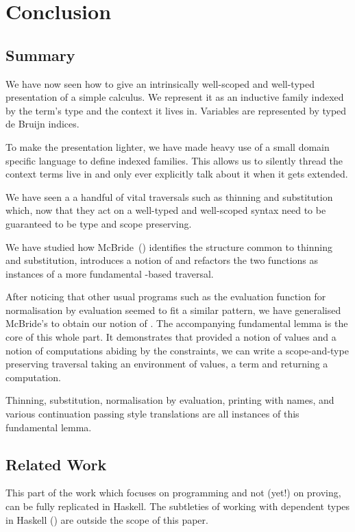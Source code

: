 \chapter{Conclusion}
\label{chapter:program-conclusion}

\section{Summary}

We have now seen how to give an intrinsically well-scoped and well-typed
presentation of a simple calculus. We represent it as an inductive family
indexed by the term's type and the context it lives in. Variables are
represented by typed de Bruijn indices.

To make the presentation lighter, we have made heavy use of a small domain
specific language to define indexed families. This allows us to silently
thread the context terms live in and only ever explicitly talk about it
when it gets extended.

We have seen a a handful of vital traversals such as thinning and substitution
which, now that they act on a well-typed and well-scoped syntax need to be
guaranteed to be type and scope preserving.

We have studied how McBride~(\citeyear{mcbride2005type}) identifies the
structure common to thinning and substitution, introduces a notion of 
and refactors the two functions as instances of a more fundamental -based
traversal.

After noticing that other usual programs such as the evaluation function for
normalisation by evaluation seemed to fit a similar pattern, we have generalised
McBride's  to obtain our notion of . The accompanying
fundamental lemma is the core of this whole part. It demonstrates that
provided a notion of values and a notion of computations abiding by the
 constraints, we can write a scope-and-type preserving traversal
taking an environment of values, a term and returning a computation.

Thinning, substitution, normalisation by evaluation, printing with names, and
various continuation passing style translations are all instances of this
fundamental lemma.

\section{Related Work}

This part of the work which focuses on programming and not (yet!) on proving,
can be fully replicated in Haskell.
The subtleties of working with dependent types in Haskell (\cite{lindley2014hasochism})
are outside the scope of this paper.

